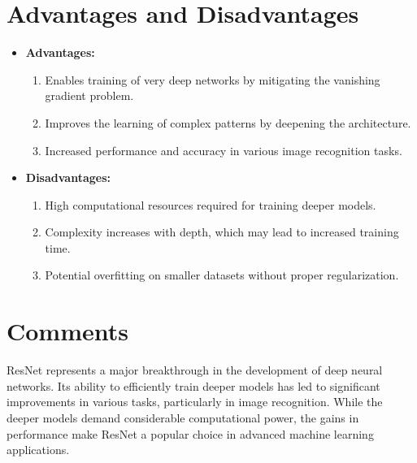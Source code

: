 \section{Advantages and Disadvantages}
\begin{itemize}
    \item \textbf{Advantages:}
    \begin{enumerate}
        \item Enables training of very deep networks by mitigating the vanishing gradient problem.
        \item Improves the learning of complex patterns by deepening the architecture.
        \item Increased performance and accuracy in various image recognition tasks.
    \end{enumerate}
    \item \textbf{Disadvantages:}
    \begin{enumerate}
        \item High computational resources required for training deeper models.
        \item Complexity increases with depth, which may lead to increased training time.
        \item Potential overfitting on smaller datasets without proper regularization.
    \end{enumerate}
\end{itemize}

\section{Comments}
ResNet represents a major breakthrough in the development of deep neural networks. Its ability to efficiently train deeper models has led to significant improvements in various tasks, particularly in image recognition. While the deeper models demand considerable computational power, the gains in performance make ResNet a popular choice in advanced machine learning applications.
